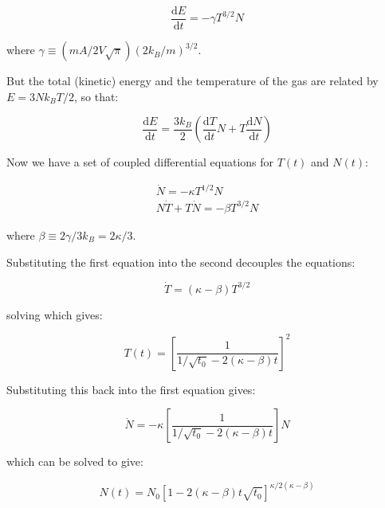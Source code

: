 \documentclass[12pt]{article}
\begin{document}
\begin{equation}
    \frac{\mathrm{d}E}{\mathrm{d}t} = -\gamma T^{3/2} N
\end{equation}

where $\gamma \equiv (mA/2V\sqrt{\pi}) (2k_{B}/m)^{3/2}$.

But the total (kinetic) energy and the temperature of the gas are related by $E = 3Nk_{B}T/2$, so that:

\begin{equation}
    \frac{\mathrm{d}E}{\mathrm{d}t} = \frac{3k_{B}}{2} \left( \frac{\mathrm{d}T}{\mathrm{d}t} N + T \frac{\mathrm{d}N}{\mathrm{d}t} \right)
\end{equation}

Now we have a set of coupled differential equations for $T(t)$ and $N(t)$:

\begin{equation}
\begin{split}
    \dot{N} = -\kappa T^{1/2} N \\
    N\dot{T} + T\dot{N} = -\beta T^{3/2} N
\end{split}
\end{equation}

where $\beta \equiv 2\gamma/3k_{B} = 2\kappa/3$.

Substituting the first equation into the second decouples the equations:

\begin{equation}
    \dot{T} = (\kappa - \beta) T^{3/2}
\end{equation}

solving which gives:

\begin{equation}
    T(t) = \left[ \frac{1}{1/\sqrt{t_{0}} - 2(\kappa - \beta) t} \right]^{2}
\end{equation}

Substituting this back into the first equation gives:

\begin{equation}
    \dot{N} = -\kappa \left[ \frac{1}{1/\sqrt{t_{0}} - 2(\kappa - \beta) t} \right] N
\end{equation}

which can be solved to give:

\begin{equation}
    N(t) = N_{0} \left[ 1 - 2(\kappa - \beta) t \sqrt{t_{0}} \right]^{\kappa/2(\kappa - \beta)}
\end{equation}

\pagebreak
\end{document}
